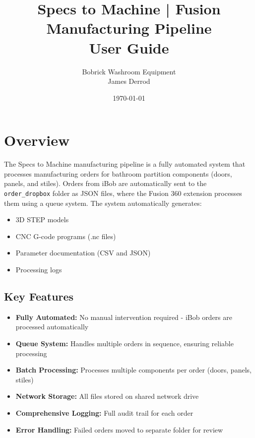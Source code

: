 \documentclass[11pt,letterpaper]{article}
\title{\textbf{Specs to Machine | Fusion Manufacturing Pipeline}\\
\large User Guide}
\author{Bobrick Washroom Equipment\\James Derrod}
\date{\today}
\begin{document}
\maketitle
\thispagestyle{empty}

\vspace{1cm}

\newpage
\tableofcontents
\newpage

\section{Overview}

The Specs to Machine manufacturing pipeline is a fully automated system that processes manufacturing orders for bathroom partition components (doors, panels, and stiles). Orders from iBob are automatically sent to the \texttt{order\_dropbox} folder as JSON files, where the Fusion 360 extension processes them using a queue system. The system automatically generates:

\begin{itemize}
    \item 3D STEP models
    \item CNC G-code programs (.nc files)
    \item Parameter documentation (CSV and JSON)
    \item Processing logs
\end{itemize}

\subsection{Key Features}

\begin{itemize}
    \item \textbf{Fully Automated:} No manual intervention required - iBob orders are processed automatically
    \item \textbf{Queue System:} Handles multiple orders in sequence, ensuring reliable processing
    \item \textbf{Batch Processing:} Processes multiple components per order (doors, panels, stiles)
    \item \textbf{Network Storage:} All files stored on shared network drive
    \item \textbf{Comprehensive Logging:} Full audit trail for each order
    \item \textbf{Error Handling:} Failed orders moved to separate folder for review
\end{itemize}
\end{document}
